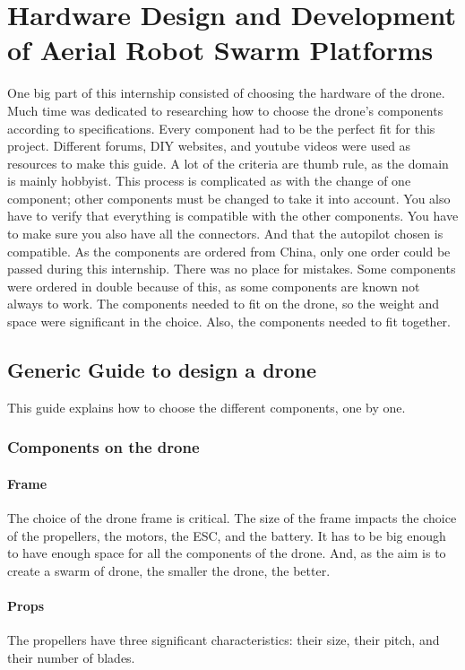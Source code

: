 \chapter{Hardware Design and Development of Aerial Robot Swarm Platforms}

One big part of this internship consisted of choosing the hardware of the drone.
Much time was dedicated to researching how to choose the drone's components according to specifications.
Every component had to be the perfect fit for this project.
Different forums, DIY websites, and youtube videos were used as resources to make this guide.
A lot of the criteria are thumb rule, as the domain is mainly hobbyist.
This process is complicated as with the change of one component; other components must be changed to take it into account.
You also have to verify that everything is compatible with the other components.
You have to make sure you also have all the connectors.
And that the autopilot chosen is compatible.
As the components are ordered from China, only one order could be passed during this internship.
There was no place for mistakes.
Some components were ordered in double because of this, as some components are known not always to work.
The components needed to fit on the drone, so the weight and space were significant in the choice.
Also, the components needed to fit together.

\section{Generic Guide to design a drone}

This guide explains how to choose the different components, one by one.

\subsection{Components on the drone}

\subsubsection{Frame}
The choice of the drone frame is critical.
The size of the frame impacts the choice of the propellers, the motors, the ESC, and the battery.
It has to be big enough to have enough space for all the components of the drone.
And, as the aim is to create a swarm of drone, the smaller the drone, the better.

\subsubsection{Props}
The propellers have three significant characteristics: their size, their pitch, and their number of blades.

